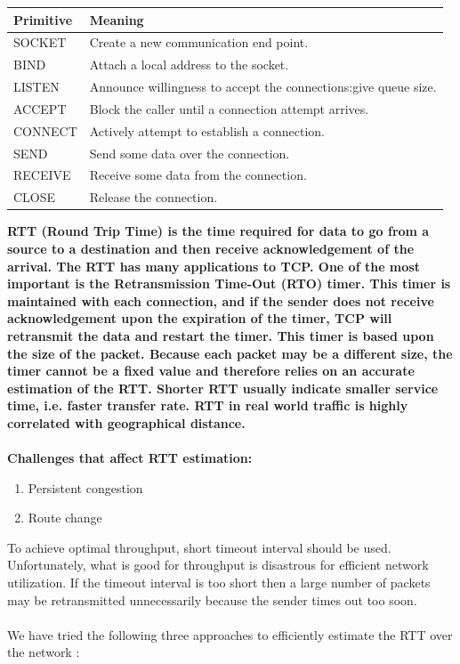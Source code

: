 \documentclass[12pt]{article}
\begin{document}
\begin{center}
\begin{tabular}{ | l | p{10cm} | }
\hline
 \bf Primitive \rm & \bf Meaning \rm \\
\hline SOCKET  & Create a new communication end point. \\
\hline BIND & Attach a local address to the socket. \\
\hline LISTEN & Announce willingness to accept the connections:give queue size. \\
\hline ACCEPT & Block the caller until a connection attempt arrives. \\
\hline CONNECT & Actively attempt to establish a connection. \\
\hline SEND & Send some data over the connection. \\
\hline RECEIVE & Receive some data from the connection. \\
\hline CLOSE & Release the connection. \\
\hline
\end{tabular}
\end{center}
\bf RTT (Round Trip Time) \rm  is the time required for data to go from a source to a destination and then receive acknowledgement of the arrival. The RTT has many applications to TCP. One of the most important is the Retransmission Time-Out (RTO) timer. This timer is maintained with each connection, and if the sender does not receive acknowledgement upon the expiration of the timer, TCP will retransmit the data and restart the timer. This timer is based upon the size of the packet. Because each packet may be a different size, the timer cannot be a fixed value and therefore relies on an accurate estimation of the RTT. Shorter RTT usually indicate smaller service time, i.e. faster transfer rate. RTT in real world traffic is highly correlated with geographical distance.\\
\\ Challenges that affect RTT estimation:
\begin{enumerate}
\item Persistent congestion 
\item Route change
\end{enumerate}
To achieve optimal throughput, short timeout interval should be used. Unfortunately, what is good for throughput is disastrous for efficient network utilization. If the timeout interval is too short then a large number of packets may be retransmitted unnecessarily because the sender times out too soon.\\
\\ We have tried the following three approaches to efficiently estimate the RTT
over the network : 
\end{document}

